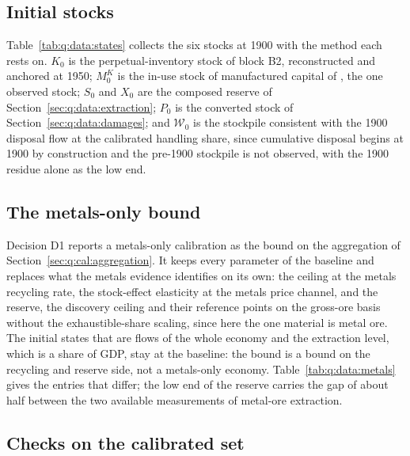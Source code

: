

\subsection{Initial stocks}\label{sec:q:data:states}

Table~\ref{tab:q:data:states} collects the six stocks at 1900 with the method each rests on. $K_0$ is the perpetual-inventory stock of block B2, reconstructed and anchored at 1950; $M^K_0$ is the in-use stock of manufactured capital of \textcite{krausmann2018}, the one observed stock; $S_0$ and $X_0$ are the composed reserve of Section~\ref{sec:q:data:extraction}; $P_0$ is the converted stock of Section~\ref{sec:q:data:damages}; and $\mathcal W_0$ is the stockpile consistent with the 1900 disposal flow at the calibrated handling share, since cumulative disposal begins at 1900 by construction and the pre-1900 stockpile is not observed, with the 1900 residue alone as the low end.



\subsection{The metals-only bound}\label{sec:q:data:metals}

Decision D1 reports a metals-only calibration as the bound on the aggregation of Section~\ref{sec:q:cal:aggregation}. It keeps every parameter of the baseline and replaces what the metals evidence identifies on its own: the ceiling at the metals recycling rate, the stock-effect elasticity at the metals price channel, and the reserve, the discovery ceiling and their reference points on the gross-ore basis without the exhaustible-share scaling, since here the one material is metal ore. The initial states that are flows of the whole economy and the extraction level, which is a share of GDP, stay at the baseline: the bound is a bound on the recycling and reserve side, not a metals-only economy. Table~\ref{tab:q:data:metals} gives the entries that differ; the low end of the reserve carries the gap of about half between the two available measurements of metal-ore extraction.



\subsection{Checks on the calibrated set}\label{sec:q:data:checks}

